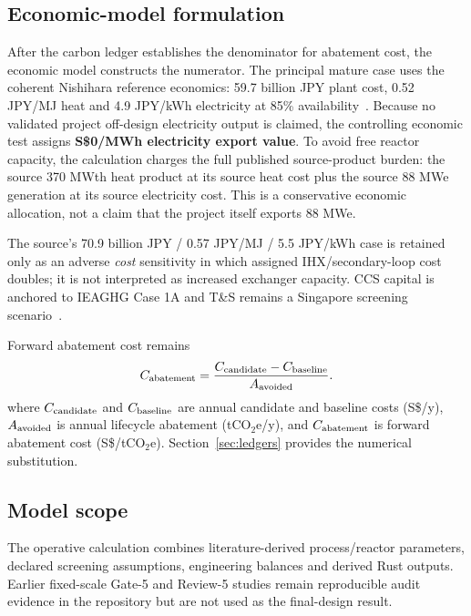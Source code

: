 \subsection{Economic-model formulation}
After the carbon ledger establishes the denominator for abatement cost, the economic model constructs the numerator. The principal mature case uses the coherent Nishihara reference economics: 59.7 billion JPY plant cost, 0.52 JPY/MJ heat and 4.9 JPY/kWh electricity at 85\% availability~\cite{nishihara2007potential}. Because no validated project off-design electricity output is claimed, the controlling economic test assigns \textbf{S\$0/MWh electricity export value}. To avoid free reactor capacity, the calculation charges the full published source-product burden: the source 370 MWth heat product at its source heat cost plus the source 88 MWe generation at its source electricity cost. This is a conservative economic allocation, not a claim that the project itself exports 88 MWe.

The source's 70.9 billion JPY / 0.57 JPY/MJ / 5.5 JPY/kWh case is retained only as an adverse \emph{cost} sensitivity in which assigned IHX/secondary-loop cost doubles; it is not interpreted as increased exchanger capacity. CCS capital is anchored to IEAGHG Case 1A and T\&S remains a Singapore screening scenario~\cite{ieaghg2017smr,mticcs2025cost}.

Forward abatement cost remains
\begin{equation}\label{eq:abatement-cost-definition}
C_{\rm abatement}=\frac{C_{\rm candidate}-C_{\rm baseline}}{A_{\rm avoided}}.
\end{equation}
where $C_{\rm candidate}$ and $C_{\rm baseline}$ are annual candidate and baseline costs (S\$/y), $A_{\rm avoided}$ is annual lifecycle abatement (tCO$_2$e/y), and $C_{\rm abatement}$ is forward abatement cost (S\$/tCO$_2$e). Section~\ref{sec:ledgers} provides the numerical substitution.

\subsection{Model scope}
The operative calculation combines literature-derived process/reactor parameters, declared screening assumptions, engineering balances and derived Rust outputs. Earlier fixed-scale Gate-5 and Review-5 studies remain reproducible audit evidence in the repository but are not used as the final-design result.
